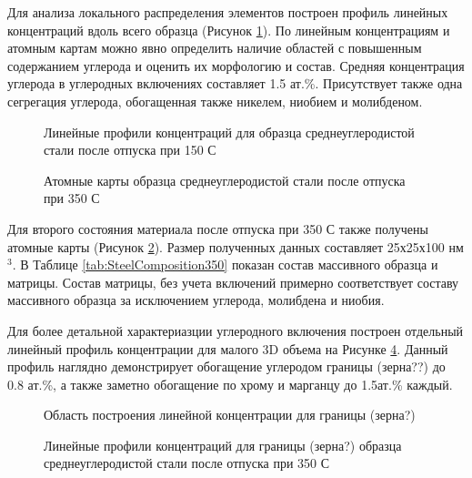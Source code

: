 Для анализа локального распределения элементов построен профиль линейных концентраций вдоль всего образца (Рисунок \cref{fig:SteelLinear1}). По линейным концентрациям и атомным картам можно явно определить наличие областей с повышенным содержанием углерода и оценить их морфологию и состав. Средняя концентрация углерода в углеродных включениях составляет 1.5 ат.\%. Присутствует также одна сегрегация углерода, обогащенная также никелем, ниобием и молибденом.

\begin{figure}[ht]
	\caption{Линейные профили концентраций для образца среднеуглеродистой стали после отпуска при 150 \textdegree С \cite{scbibRyabov}}
	\label{fig:SteelLinear1}
\end{figure}

\begin{figure}[htb]
	\caption{Атомные карты образца среднеуглеродистой стали после отпуска при 350 \textdegree С \cite{scbibRyabov}}
	\label{fig:SteelAtomMaps2}
\end{figure}

Для второго состояния материала после отпуска при 350 \textdegree С также получены атомные карты (Рисунок \cref{fig:SteelAtomMaps2}). Размер полученных данных составляет 25х25х100 нм$^{3}$. В Таблице \cref{tab:SteelComposition350} показан состав массивного образца и матрицы. Состав матрицы, без учета включений примерно соответствует составу массивного образца за исключением углерода, молибдена и ниобия. 

Для более детальной характериазции углеродного включения построен отдельный линейный профиль концентрации для малого 3D объема на Рисунке \cref{fig:SteelLinear2}. Данный профиль наглядно демонстрирует обогащение углеродом границы (зерна??) до 0.8 ат.\%, а также заметно обогащение по хрому и марганцу до 1.5ат.\% каждый.

\begin{figure}[htb]
	\caption{Область построения линейной концентрации для границы (зерна?)\cite{scbibRyabov}}
	\label{fig:SteelAtomMapsLin}
\end{figure}

\begin{figure}[htb]
	\caption{Линейные профили концентраций для границы (зерна?) образца среднеуглеродистой стали после отпуска при 350 \textdegree С \cite{scbibRyabov}}
	\label{fig:SteelLinear2}
\end{figure}


